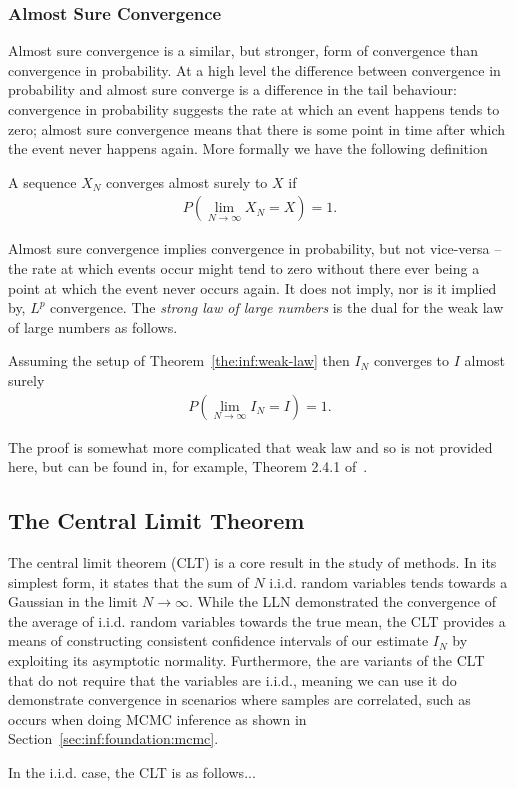 \subsubsection{Almost Sure Convergence}
\label{sec:inf:mc:conv:as}

Almost sure convergence is a similar, but stronger, form of convergence than convergence in
probability.  At a high level the difference between
convergence in probability and almost sure converge is a difference in the tail behaviour:
convergence in probability suggests the rate at which an event happens tends to zero; almost
sure convergence means that there is some point in time after which the event never happens
again.  More formally we have the following definition
\begin{definition}
A sequence $X_N$ converges almost surely to $X$ if
\begin{align}
	P\left(\lim\limits_{N\rightarrow\infty} X_N=X\right)=1.
\end{align}
\end{definition}
Almost sure convergence implies convergence in probability, but not vice-versa -- the rate
at which events occur might tend to zero without there ever being a point at which the
event never occurs again.  It does not imply, nor is it implied by, $L^p$ convergence.
The \emph{strong law of large numbers} is the dual for the weak law of large numbers as
follows.
\begin{theorem}
	Assuming the setup of Theorem~\ref{the:inf:weak-law} then $I_N$ converges to $I$ almost surely
	\begin{align}
	P\left(\lim\limits_{N\rightarrow\infty} I_N=I\right)=1.
	\end{align}
\end{theorem}
The proof is somewhat more complicated that weak law and so is not provided here, but can
be found in, for example, Theorem 2.4.1 of~\cite{durrett2010probability}.

\subsection{The Central Limit Theorem}
\label{sec:inf:mc:clt}

The central limit theorem (CLT) is a core result in the study of \mc methods.  In its simplest form,
it states that the sum of $N$ i.i.d. random variables tends towards a Gaussian in the limit $N\to\infty$.
While the LLN demonstrated the convergence of the average of i.i.d. random variables towards
the true mean, the CLT provides a means of constructing consistent confidence intervals of our estimate
$I_N$ by exploiting its asymptotic normality.  Furthermore, the are variants of the CLT that do not
require that the variables are i.i.d., meaning we can use it do demonstrate convergence in scenarios
where samples are correlated, such as occurs when doing MCMC inference as shown in
Section~\ref{sec:inf:foundation:mcmc}.

In the i.i.d. case, the CLT is as follows...